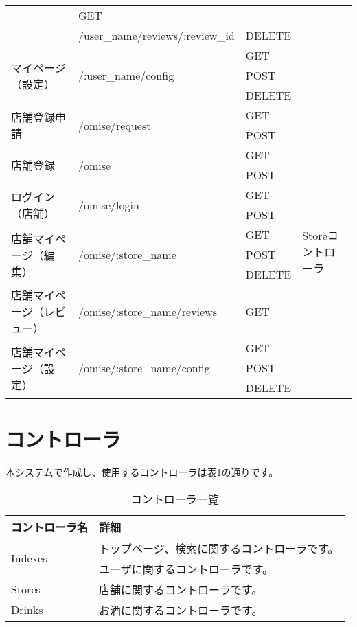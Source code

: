 \documentclass[a4j,titlepage]{jarticle}
\begin{document}
\begin{table}[!htbp]
\begin{center}
\begin{tabular}{|l|l|l|p{4cm}|}
& GET & \\\cline{2-3}
 & /user\_name/reviews/:review\_id & DELETE & \\\cline{1-3}
\multirow{3}{*}{マイページ（設定）} & \multirow{3}{*}{/:user\_name/config}
& GET & \\\cline{3-3}
 & & POST & \\\cline{3-3}
 & & DELETE & \\\hline
 \multirow{2}{*}{店舗登録申請} & \multirow{2}{*}{/omise/request}
 & GET & \multirow{13}{*}{Storeコントローラ} \\\cline{3-3}
  & & POST &\\\cline{1-3}
 \multirow{2}{*}{店舗登録} & \multirow{2}{*}{/omise}
 & GET &\\\cline{3-3}
  & & POST &\\\cline{1-3}
 \multirow{2}{*}{ログイン（店舗）} & \multirow{2}{*}{/omise/login}
 & GET & \\\cline{3-3}
  & & POST & \\\cline{1-3}
\multirow{3}{*}{店舗マイページ（編集）}& \multirow{3}{*}{/omise/:store\_name}
& GET & \\\cline{3-3}
 & & POST & \\\cline{3-3}
 & & DELETE & \\\cline{1-3}
店舗マイページ（レビュー） & /omise/:store\_name/reviews
& GET & \\\cline{1-3}
\multirow{3}{*}{店舗マイページ（設定）} & \multirow{3}{*}{/omise/:store\_name/config}
& GET & \\\cline{3-3}
 & & POST & \\\cline{3-3}
 & & DELETE & \\\hline
\end{tabular}
\end{center}
\end{table}

\section{コントローラ}
本システムで作成し、使用するコントローラは表\ref{controller}の通りです。

\begin{table}[!htbp]
\caption{コントローラ一覧}
\label{controller}
\small
\begin{center}
\begin{tabular}{|l|p{5cm}|}\hline
コントローラ名 & 詳細 \\\hline\hline
\multirow{2}{*}{Indexes} & トップページ、検索に関するコントローラです。 \\\hline
Users & ユーザに関するコントローラです。 \\\hline
Stores & 店舗に関するコントローラです。 \\\hline
Drinks & お酒に関するコントローラです。 \\\hline
\end{tabular}
\end{center}
\end{table}
\end{document}
